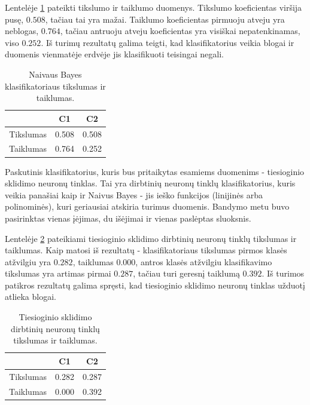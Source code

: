 \documentclass[]{vgtuef}
\begin{document}
Lentelėje \ref{table:nb_scores} pateikti tikslumo ir taiklumo duomenys. Tikslumo koeficientas viršija pusę, $0.508$, tačiau tai yra mažai. Taiklumo koeficientas pirmuoju atveju yra neblogas, $0.764$, tačiau antruoju atveju koeficientas yra visiškai nepatenkinamas, viso $0.252$. Iš turimų rezultatų galima teigti, kad klasifikatorius veikia blogai ir duomenis vienmatėje erdvėje jis klasifikuoti teisingai negali.

\begin{table}[!t]
  \centering
  \caption{Naivaus Bayes klasifikatoriaus tikslumas ir taiklumas.}
  \label{table:nb_scores}
  \begin{tabular}{|c|c|c|} \hline
    & C1 & C2 \\ \hline
    Tikslumas & 0.508 & 0.508 \\ \hline
    Taiklumas & 0.764 & 0.252 \\ \hline
  \end{tabular}
\end{table}

Paskutinis klasifikatorius, kuris bus pritaikytas esamiems duomenims - tiesioginio sklidimo neuronų tinklas. Tai yra dirbtinių neuronų tinklų klasifikatorius, kuris veikia panašiai kaip ir Naivus Bayes - jis ieško funkcijos (linijinės arba polinominės), kuri geriausiai atskiria turimus duomenis. Bandymo metu buvo pasirinktas vienas įėjimas, du išėjimai ir vienas paslėptas sluoksnis. 

Lentelėje \ref{table:ffn_scores} pateikiami tiesioginio sklidimo dirbtinių neuronų tinklų tikslumas ir taiklumas. Kaip matosi iš rezultatų - klasifikatoriaus tikslumas pirmos klasės atžvilgiu yra $0.282$, taiklumas $0.000$, antros klasės atžvilgiu klasifikavimo tikslumas yra artimas pirmai $0.287$, tačiau turi geresnį taiklumą $0.392$. Iš turimos patikros rezultatų galima spręsti, kad tiesioginio sklidimo neuronų tinklas užduotį atlieka blogai.

\begin{table}[!t]
  \centering
  \caption{Tiesioginio sklidimo dirbtinių neuronų tinklų tikslumas ir taiklumas.}
  \label{table:ffn_scores}
  \begin{tabular}{|c|c|c|} \hline
    & C1 & C2 \\ \hline
    Tikslumas & 0.282 & 0.287 \\ \hline
    Taiklumas & 0.000 & 0.392 \\ \hline
  \end{tabular}
\end{table}
\end{document}
